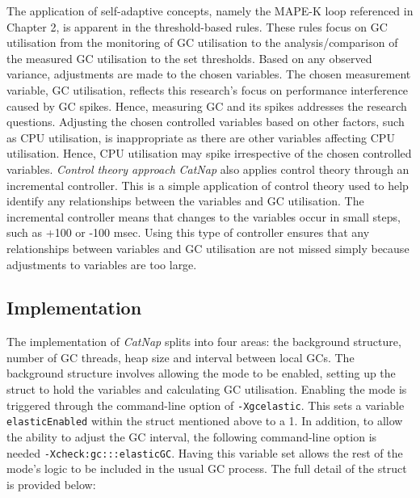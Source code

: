 The application of self-adaptive concepts, namely the MAPE-K loop referenced in Chapter 2, is
apparent in the threshold-based rules. These rules focus on GC
utilisation from the monitoring of GC utilisation to the
analysis/comparison of the measured GC utilisation to the set
thresholds. Based on any observed variance, adjustments are made to the
chosen variables.
\newline\newline
The chosen measurement variable, GC utilisation, reflects this research's
focus on performance interference caused by GC spikes. Hence, measuring
GC and its spikes addresses the research questions. Adjusting the chosen
controlled variables based on other factors, such as CPU utilisation, is
inappropriate as there are other variables affecting CPU utilisation.
Hence, CPU utilisation may spike irrespective of the chosen controlled
variables.
\newline\newline
\emph{Control theory approach}
\newline\newline
\emph{CatNap} also applies control theory through an incremental controller. This is a simple application of control theory used to help identify any relationships between the variables and GC utilisation. The incremental controller means that changes to the variables occur in small steps, such as +100 or -100 msec. Using this type of controller ensures that any relationships between variables and GC utilisation are not missed simply because adjustments to variables are too large.
\subsection{Implementation}
The implementation of \emph{CatNap} splits into four areas: the background
structure, number of GC threads, heap size and interval between local
GCs. The background structure involves allowing the mode to be enabled,
setting up the struct to hold the variables and calculating GC
utilisation. Enabling the mode is triggered through the command-line
option of \verb|-Xgcelastic|. This sets a variable \verb|elasticEnabled| within the
struct mentioned above to a 1. In addition, to allow the ability to
adjust the GC interval, the following command-line option is needed
\verb|-Xcheck:gc:::elasticGC|. Having this variable set allows the rest of the
mode's logic to be included in the usual GC process. The full detail of
the struct is provided below:

